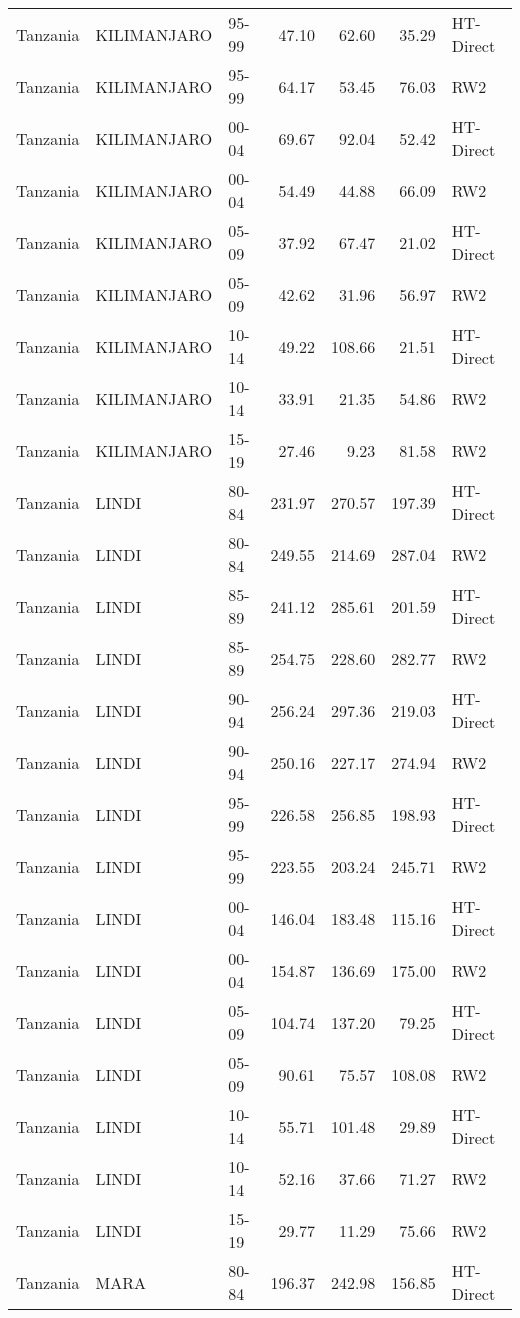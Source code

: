 \begin{longtable}{lllrrrl}
  Tanzania & KILIMANJARO & 95-99 & 47.10 & 62.60 & 35.29 & HT-Direct \\ 
  Tanzania & KILIMANJARO & 95-99 & 64.17 & 53.45 & 76.03 & RW2 \\ 
  Tanzania & KILIMANJARO & 00-04 & 69.67 & 92.04 & 52.42 & HT-Direct \\ 
  Tanzania & KILIMANJARO & 00-04 & 54.49 & 44.88 & 66.09 & RW2 \\ 
  Tanzania & KILIMANJARO & 05-09 & 37.92 & 67.47 & 21.02 & HT-Direct \\ 
  Tanzania & KILIMANJARO & 05-09 & 42.62 & 31.96 & 56.97 & RW2 \\ 
  Tanzania & KILIMANJARO & 10-14 & 49.22 & 108.66 & 21.51 & HT-Direct \\ 
  Tanzania & KILIMANJARO & 10-14 & 33.91 & 21.35 & 54.86 & RW2 \\ 
  Tanzania & KILIMANJARO & 15-19 & 27.46 & 9.23 & 81.58 & RW2 \\ 
  Tanzania & LINDI & 80-84 & 231.97 & 270.57 & 197.39 & HT-Direct \\ 
  Tanzania & LINDI & 80-84 & 249.55 & 214.69 & 287.04 & RW2 \\ 
  Tanzania & LINDI & 85-89 & 241.12 & 285.61 & 201.59 & HT-Direct \\ 
  Tanzania & LINDI & 85-89 & 254.75 & 228.60 & 282.77 & RW2 \\ 
  Tanzania & LINDI & 90-94 & 256.24 & 297.36 & 219.03 & HT-Direct \\ 
  Tanzania & LINDI & 90-94 & 250.16 & 227.17 & 274.94 & RW2 \\ 
  Tanzania & LINDI & 95-99 & 226.58 & 256.85 & 198.93 & HT-Direct \\ 
  Tanzania & LINDI & 95-99 & 223.55 & 203.24 & 245.71 & RW2 \\ 
  Tanzania & LINDI & 00-04 & 146.04 & 183.48 & 115.16 & HT-Direct \\ 
  Tanzania & LINDI & 00-04 & 154.87 & 136.69 & 175.00 & RW2 \\ 
  Tanzania & LINDI & 05-09 & 104.74 & 137.20 & 79.25 & HT-Direct \\ 
  Tanzania & LINDI & 05-09 & 90.61 & 75.57 & 108.08 & RW2 \\ 
  Tanzania & LINDI & 10-14 & 55.71 & 101.48 & 29.89 & HT-Direct \\ 
  Tanzania & LINDI & 10-14 & 52.16 & 37.66 & 71.27 & RW2 \\ 
  Tanzania & LINDI & 15-19 & 29.77 & 11.29 & 75.66 & RW2 \\ 
  Tanzania & MARA & 80-84 & 196.37 & 242.98 & 156.85 & HT-Direct \\ 

\end{longtable}
